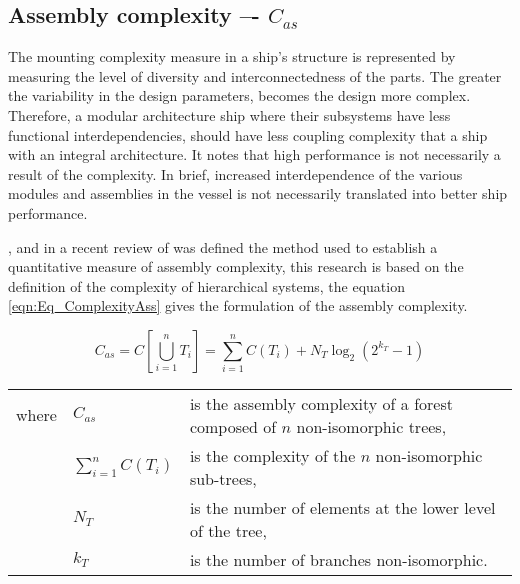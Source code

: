 \subsection{Assembly complexity –- $C_{as}$}
The mounting complexity measure in a ship's structure is represented by measuring the level of diversity and interconnectedness of the parts. The greater the variability in the design parameters, becomes the design more complex. Therefore, a modular architecture ship where their subsystems have less functional interdependencies, should have less coupling complexity that a ship with an integral architecture. It notes that high performance is not necessarily a result of the complexity. In brief,  increased interdependence of the various modules and assemblies in the vessel is not necessarily translated into better ship performance.


\cite{ceccatto1988complexity},  and in a recent review of \cite{Shannon01} was defined the method used to establish a quantitative measure of assembly complexity, this research is based on the definition of the complexity of hierarchical systems, the equation \ref{eqn:Eq_ComplexityAss} gives the formulation of the assembly complexity.


\begin{equation}
C_{as} = C\left[ \bigcup_{i=1}^n T_i \right] = \sum_{i=1}^{n} C(T_{i}) + N_T \log _2(2^{k_T}-1)
\label{eqn:Eq_ComplexityAss}
\end{equation}


\begin{tabular}{lll}
where & $C_{as}$ & is the assembly complexity of a forest composed of $n$ non-isomorphic trees,\\
& $\sum_{i=1}^{n} C(T_{i})$ & is the complexity of the $n$ non-isomorphic sub-trees,\\
& $N_T$ & is the number of elements at the lower level of the tree,\\
& $k_T$ & is the number of branches non-isomorphic.
\end{tabular}


